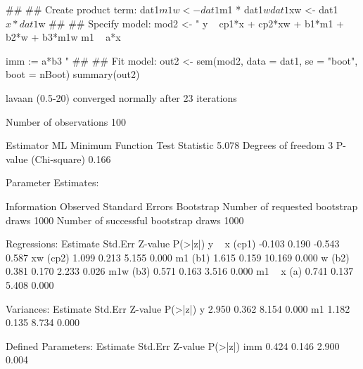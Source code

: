\begin{Schunk}
\begin{Sinput}
 ##
 ## Create product term:
 dat1$m1w <- dat1$m1 * dat1$w
 dat1$xw <- dat1$x * dat1$w
 ##
 ## Specify model:
 mod2 <- "
 y ~ cp1*x + cp2*xw + b1*m1 + b2*w + b3*m1w
 m1 ~ a*x
 
 imm := a*b3
 "
 ##
 ## Fit model:
 out2 <- sem(mod2, data = dat1, se = "boot", boot = nBoot)
 summary(out2)
\end{Sinput}
\begin{Soutput}
lavaan (0.5-20) converged normally after  23 iterations

  Number of observations                           100

  Estimator                                         ML
  Minimum Function Test Statistic                5.078
  Degrees of freedom                                 3
  P-value (Chi-square)                           0.166

Parameter Estimates:

  Information                                 Observed
  Standard Errors                            Bootstrap
  Number of requested bootstrap draws             1000
  Number of successful bootstrap draws            1000

Regressions:
                   Estimate  Std.Err  Z-value  P(>|z|)
  y ~                                                 
    x        (cp1)   -0.103    0.190   -0.543    0.587
    xw       (cp2)    1.099    0.213    5.155    0.000
    m1        (b1)    1.615    0.159   10.169    0.000
    w         (b2)    0.381    0.170    2.233    0.026
    m1w       (b3)    0.571    0.163    3.516    0.000
  m1 ~                                                
    x          (a)    0.741    0.137    5.408    0.000

Variances:
                   Estimate  Std.Err  Z-value  P(>|z|)
    y                 2.950    0.362    8.154    0.000
    m1                1.182    0.135    8.734    0.000

Defined Parameters:
                   Estimate  Std.Err  Z-value  P(>|z|)
    imm               0.424    0.146    2.900    0.004
\end{Soutput}
\end{Schunk}
